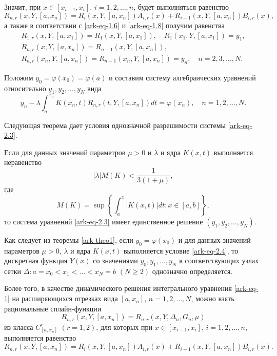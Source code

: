 Значит, при $x\in[x_{i-1},x_i]$, $i=1,2,\dots,n$, будет выполняться равенство
\begin{equation}\label{ark-eq-2.1}
R_{n,r}(x,Y,[a,x_n])=R_i(x,Y,[a,x_n])A_{i,r}(x)+R_{i-1}(x,Y,[a,x_n]) B_{i,r}(x),
\end{equation}
а также в соответствии с \eqref{ark-eq-1.6} и \eqref{ark-eq-1.8} получим равенства
\begin{equation}\label{ark-eq-2.2}
\begin{array}{l}
 R_{1,r}(x,Y,[a,x_1])=R_1(x,Y,[a,x_1]),\quad R_1(x_1,Y,[a,x_1])=y_1,\\
 R_{n,r}(x,Y,[a,x_n])=R_{n-1}(x,Y,[a,x_n]),\\
R_{n,r}(x_n,Y,[a,x_n])=R_{n-1}(x_n,Y,[a,x_n])=y_n,\quad n=2,3,\dots,N.
\end{array}
\end{equation}

Положим $y_0=\varphi(x_0)=\varphi(a)$ и составим систему алгебраических уравнений относительно
$y_1, y_2, \dots, y_N$ вида
\begin{equation}\label{ark-eq-2.3}
y_n-\lambda \int_a^{x_n} K(x_n,t) R_{n,r}(t,Y,[a,x_n])dt=\varphi(x_n),\quad n=1,2,\dots,N.
\end{equation}

Следующая теорема дает условия однозначной разрешимости системы \eqref{ark-eq-2.3}.
\begin{theorem} \label{ark-theo1}
Если для данных значений параметров $\mu>0$ и $\lambda$ и ядра $K(x,t)$ выполняется
неравенство
\begin{equation}\label{ark-eq-2.4}
|\lambda| M(K)< \frac 1{3(1+\mu)},
\end{equation}
где
$$
M(K)=\sup\left\{\int_a^x |K(x,t)|dt: x\in [a,b]\right\},
$$
то система уравнений \eqref{ark-eq-2.3} имеет единственное решение $(y_1,y_2,\dots,y_N)$.
\end{theorem}


Как следует из теоремы \ref{ark-theo1}, если $y_0=\varphi(x_0)$ и для данных значений параметров
$\mu>0$, $\lambda$ и ядра $K(x,t)$ выполняется условие \eqref{ark-eq-2.4}, то дискретная функция
$Y(x)$ со значениями $y_0, y_1, \dots, y_N$ в соответствующих узлах сетки
$\Delta: a=x_0<x_1<\dots <x_N=b$ $(N\geqslant 2)$ однозначно определяется.

Более того, в качестве динамического решения интегрального уравнения \eqref{ark-eq-1} на
расширяющихся отрезках вида $[a,x_n]$, $n=1,2,\dots,N$, можно взять рациональные
сплайн-функции
$$
R_{n,r}(x,Y,[a,x_n])=R_{n,r}(x,Y,\Delta_n, G_n,\mu)
$$
из класса $C^r_{[a,x_n]}$ $(r=1,2)$, для которых при $x\in[x_{i-1},x_i]$, $i=1,2,\dots,n$,
выполняется равенство
\begin{equation}\label{ark-eq-2.8}
R_{n,r}(x,Y,[a,x_n])=R_i(x,Y,[a,x_n])A_{i,r}(x)+R_{i-1}(x,Y,[a,x_n])B_{i,r}(x).
\end{equation}


